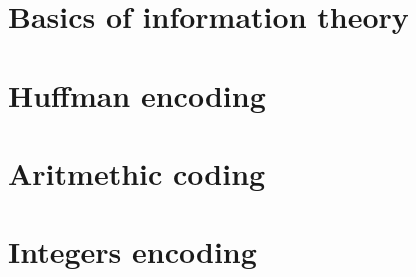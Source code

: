 \documentclass[moon, colormath]{lectures2}
\begin{document}
    \section{Basics of information theory}
    

    \section{Huffman encoding}
    

    \section{Aritmethic coding}
    

    \section{Integers encoding}
    

    \clearpage\printbibliography
    \clearpage\printglossaries
\end{document}

